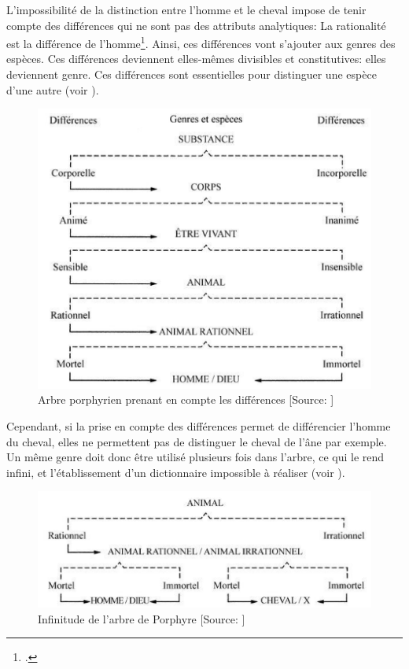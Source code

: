 

L'impossibilité de la distinction entre l'homme et le cheval impose de tenir compte des différences qui ne sont pas des attributs analytiques: \og La rationalité est la différence de l'homme\fg{}\footcite[chap.1]{eco_arbre_2010}. Ainsi, ces différences vont s'ajouter aux genres des espèces. Ces différences deviennent elles-mêmes divisibles et constitutives: elles deviennent genre. Ces différences sont essentielles pour distinguer une espèce d'une autre (voir ).\\

\begin{figure}[!h]
	\centering
	\includegraphics[width=12cm]{images/arbre_porprhyre_differences.png}
	\caption[Arbre porphyrien prenant en compte les différences]{Arbre porphyrien prenant en compte les différences [Source: \cite[chap.1]{eco_arbre_2010}]}
	\label{arbre_porphyre_differences}
\end{figure}

Cependant, si la prise en compte des différences permet de différencier l'homme du cheval, elles ne permettent pas de distinguer le cheval de l'âne par exemple. Un même genre doit donc être utilisé plusieurs fois dans l'arbre, ce qui le rend infini, et l'établissement d'un dictionnaire impossible à réaliser (voir ).\\

\begin{figure}[!h]
	\centering
	\includegraphics[width=12cm]{images/arbre_porphyre_boucle.png}
	\caption[Infinitude de l'arbre de Porphyre]{Infinitude de l'arbre de Porphyre [Source: \cite[chap.1]{eco_arbre_2010}]}
	\label{arbre_porphyre_boucle}
\end{figure}

